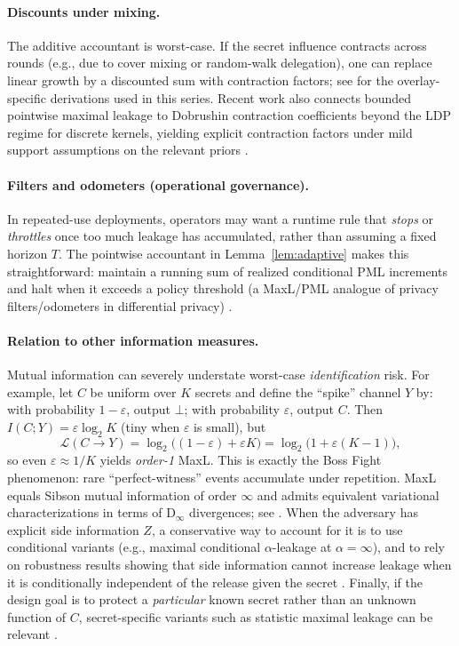\documentclass[11pt]{article}
\newcommand{\Dinfty}{\mathrm{D_{\infty}}}
\newcommand{\MaxL}{\mathcal{L}}
\newcommand{\logtwo}{\log_2}
\begin{document}
\paragraph{Discounts under mixing.}
The additive accountant is worst-case.
If the secret influence contracts across rounds (e.g., due to cover mixing or random-walk delegation), one can replace linear growth by a discounted sum with contraction factors; see \cite{series:spectral} for the overlay-specific derivations used in this series. Recent work also connects bounded pointwise maximal leakage to Dobrushin contraction coefficients beyond the LDP regime for discrete kernels, yielding explicit contraction factors under mild support assumptions on the relevant priors \cite{grosse2026dobrushin}.

\paragraph{Filters and odometers (operational governance).}
In repeated-use deployments, operators may want a runtime rule that \emph{stops} or \emph{throttles} once too much leakage has accumulated, rather than assuming a fixed horizon $T$.
The pointwise accountant in Lemma~\ref{lem:adaptive} makes this straightforward: maintain a running sum of realized conditional PML increments and halt when it exceeds a policy threshold (a MaxL/PML analogue of privacy filters/odometers in differential privacy) \cite{rogers2016privacyodometers}.

\paragraph{Relation to other information measures.}
Mutual information can severely understate worst-case \emph{identification} risk.
For example, let $C$ be uniform over $K$ secrets and define the ``spike'' channel $Y$ by: with probability $1-\varepsilon$, output $\bot$; with probability $\varepsilon$, output $C$.
Then $I(C;Y)=\varepsilon\logtwo K$ (tiny when $\varepsilon$ is small), but
\[
\MaxL(C\!\to\!Y)=\logtwo\big((1-\varepsilon)+\varepsilon K\big)=\logtwo\big(1+\varepsilon(K-1)\big),
\]
so even $\varepsilon\approx 1/K$ yields \emph{order-1} MaxL.
This is exactly the Boss Fight phenomenon: rare ``perfect-witness'' events accumulate under repetition.
MaxL equals Sibson mutual information of order $\infty$ and admits equivalent variational characterizations in terms of $\Dinfty$ divergences; see \cite{issa2016sibson,issa2020operational,esposito2019renyi}.
When the adversary has explicit side information $Z$, a conservative way to account for it is to use conditional variants (e.g., maximal conditional $\alpha$-leakage at $\alpha=\infty$), and to rely on robustness results showing that side information cannot increase leakage when it is conditionally independent of the release given the secret \cite{liao2019sideinfo,liao2020malprops}.
Finally, if the design goal is to protect a \emph{particular} known secret rather than an unknown function of $C$, secret-specific variants such as statistic maximal leakage can be relevant \cite{wang2024statmaxl}.
\end{document}
